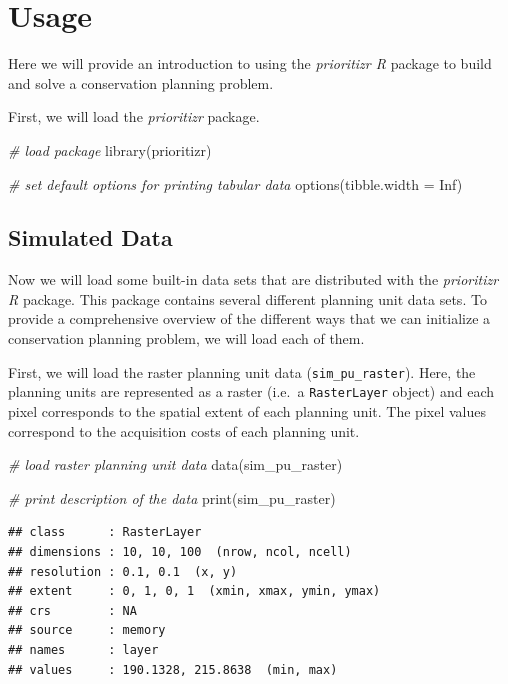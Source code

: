 \documentclass[
  12pt,
]{book}
\newenvironment{Shaded}{\begin{snugshade}}{\end{snugshade}}
\newcommand{\AttributeTok}[1]{\textcolor[rgb]{0.77,0.63,0.00}{#1}}
\newcommand{\CommentTok}[1]{\textcolor[rgb]{0.56,0.35,0.01}{\textit{#1}}}
\newcommand{\ConstantTok}[1]{\textcolor[rgb]{0.00,0.00,0.00}{#1}}
\newcommand{\FunctionTok}[1]{\textcolor[rgb]{0.00,0.00,0.00}{#1}}
\newcommand{\NormalTok}[1]{#1}
\begin{document}
\hypertarget{usage}{%
\section{Usage}\label{usage}}

Here we will provide an introduction to using the \emph{prioritizr R} package to build and solve a conservation planning problem.

First, we will load the \emph{prioritizr} package.

\begin{Shaded}
\begin{Highlighting}[]
\CommentTok{\# load package}
\FunctionTok{library}\NormalTok{(prioritizr)}

\CommentTok{\# set default options for printing tabular data}
\FunctionTok{options}\NormalTok{(}\AttributeTok{tibble.width =} \ConstantTok{Inf}\NormalTok{)}
\end{Highlighting}
\end{Shaded}

\hypertarget{simulated-data}{%
\subsection{Simulated Data}\label{simulated-data}}

Now we will load some built-in data sets that are distributed with the \emph{prioritizr R} package. This package contains several different planning unit data sets. To provide a comprehensive overview of the different ways that we can initialize a conservation planning problem, we will load each of them.

First, we will load the raster planning unit data (\texttt{sim\_pu\_raster}). Here, the planning units are represented as a raster (i.e.~a \texttt{RasterLayer} object) and each pixel corresponds to the spatial extent of each planning unit. The pixel values correspond to the acquisition costs of each planning unit.

\begin{Shaded}
\begin{Highlighting}[]
\CommentTok{\# load raster planning unit data}
\FunctionTok{data}\NormalTok{(sim\_pu\_raster)}

\CommentTok{\# print description of the data}
\FunctionTok{print}\NormalTok{(sim\_pu\_raster)}
\end{Highlighting}
\end{Shaded}

\begin{verbatim}
## class      : RasterLayer 
## dimensions : 10, 10, 100  (nrow, ncol, ncell)
## resolution : 0.1, 0.1  (x, y)
## extent     : 0, 1, 0, 1  (xmin, xmax, ymin, ymax)
## crs        : NA 
## source     : memory
## names      : layer 
## values     : 190.1328, 215.8638  (min, max)
\end{verbatim}
\end{document}
